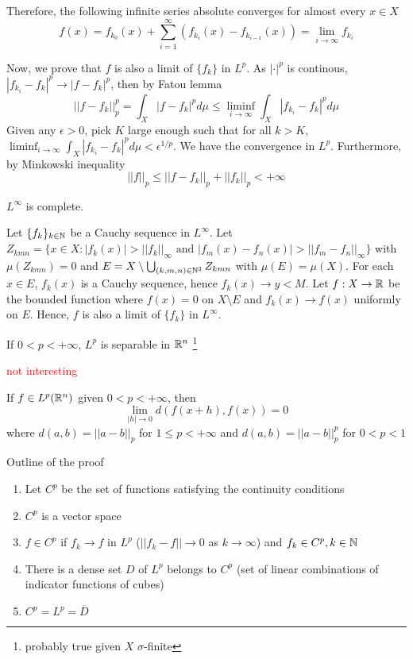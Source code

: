 \documentclass{report}
\begin{document}
Therefore, the following infinite series absolute converges for almost every $x \in X$
\[
    f(x) = f_{k_0}(x) + \sum_{i=1}^\infty (f_{k_i}(x) - f_{k_{i-1}}(x)) = \lim_{i \to \infty} f_{k_i}
\]

Now, we prove that $f$ is also a limit of $\{ f_k \}$ in $L^p$. As $|\cdot|^p$ is continous, $|f_{k_i} - f_k|^p \to |f - f_k|^p$, then by Fatou lemma
\[
    ||f - f_k||_p^p = \int_X |f - f_k|^p d\mu \leq \liminf_{i \to \infty} \int_X |f_{k_i} - f_k|^p d\mu
\]
Given any $\epsilon > 0$, pick $K$ large enough such that for all $k > K$, $\liminf_{i \to \infty} \int_X |f_{k_i} - f_k|^p d\mu < \epsilon^{1/p}$. We have the convergence in $L^p$. Furthermore, by Minkowski inequality
\[
    ||f||_p \leq ||f - f_k||_p + ||f_k||_p < +\infty
\]

\begin{proposition}
    $L^\infty$ is complete.
\end{proposition}

Let $\{ f_k \}_{k \in \mathbb{N}}$ be a Cauchy sequence in $L^\infty$. Let $Z_{k m n} = \{ x \in X: |f_k(x)| > ||f_k||_\infty \text{ and } |f_m(x) - f_n(x)| > ||f_m - f_n||_\infty \}$ with $\mu(Z_{k m n}) = 0$ and $E = X \setminus \bigcup_{(k, m, n) \in \mathbb{N}^3} Z_{k m n}$ with $\mu(E) = \mu(X)$. For each $x \in E$, $f_k(x)$ is a Cauchy sequence, hence $f_k(x) \to y < M$. Let $f: X \to \mathbb{R}$ be the bounded function where $f(x) = 0$ on $X \setminus E$ and $f_k(x) \to f(x)$ uniformly on $E$. Hence, $f$ is also a limit of $\{ f_k \}$ in $L^\infty$.

\begin{proposition}
    If $0 < p < +\infty$, $L^p$ is separable in $\mathbb{R}^n$ \footnote{probably true given $X$ $\sigma$-finite}
\end{proposition}

\textcolor{red}{not interesting}

\begin{theorem}[Continuity in $L^p(\R^n)$]
    If $f \in L^p(\mathbb{R}^n)$ given $0 < p < +\infty$, then
    \[
        \lim_{|h| \to 0} d(f(x + h), f(x)) = 0
    \]
    where $d(a, b) = ||a - b||_p$ for $1 \leq p < +\infty$ and $d(a, b) = ||a - b||_p^p$ for $0 < p < 1$
\end{theorem}

Outline of the proof
\begin{enumerate}
    \item Let $C^p$ be the set of functions satisfying the continuity conditions
    \item $C^p$ is a vector space
    \item $f \in C^p$ if $f_k \to f$ in $L^p$ ($||f_k - f|| \to 0$ as $k \to \infty$) and $f_k \in C^p, k \in \mathbb{N}$
    \item There is a dense set $D$ of $L^p$ belongs to $C^p$ (set of linear combinations of indicator functions of cubes)
    \item $C^p = L^p = \overline{D}$
\end{enumerate}
\end{document}
